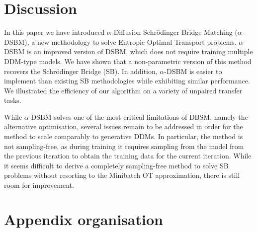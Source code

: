 \documentclass{article}
\begin{document}
\section{Discussion}

In this paper we have introduced $\alpha$-Diffusion Schr\"odinger  Bridge Matching ($\alpha$-DSBM), a new methodology to solve Entropic Optimal Transport problems. $\alpha$-DSBM is an improved version of DSBM, which does not require training multiple DDM-type models. 
We have shown that a non-parametric version of this method recovers the Schr\"odinger Bridge (SB). In addition, $\alpha$-DSBM is easier to implement than existing SB methodologies while exhibiting similar performance. We illustrated the efficiency of our algorithm on a variety of unpaired transfer tasks. 

While $\alpha$-DSBM solves one of the most critical limitations of DBSM, namely the alternative optimisation, several issues remain to be addressed in order for the method to scale comparably to generative DDMs. In particular, the method is not sampling-free, as during training it requires sampling from the model from the previous iteration to obtain the training data for the current iteration. While it seems difficult to derive a completely sampling-free method to solve SB problems without resorting to the Minibatch OT approximation, there is still room for improvement. 
\newpage




\newpage

\appendix

\section{Appendix organisation}
\end{document}
